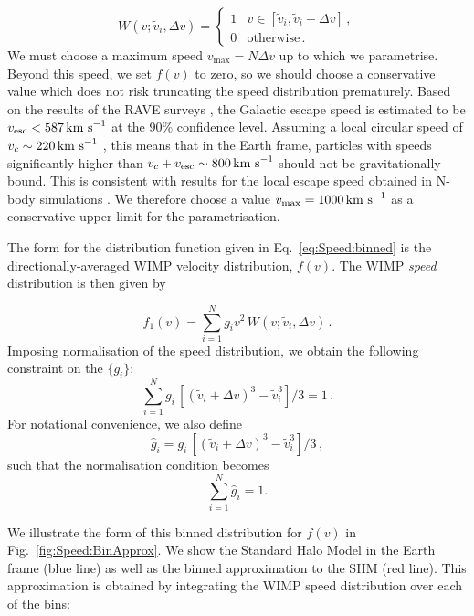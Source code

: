 \begin{equation}
W(v;\tilde{v}_i,\Delta v) =
\begin{cases}
   1 &  v \in [\tilde{v}_i,\tilde{v}_i+\Delta v]\,, \\
   0  & \text{otherwise}\,.
  \end{cases}
\end{equation}
We must choose a maximum speed $v_\textrm{max} = N\Delta v$ up to which we parametrise. Beyond this speed, we set $f(v)$ to zero, so we should choose a conservative value which does not risk truncating the speed distribution prematurely. Based on the results of the RAVE surveys \cite{RAVE:2007, RAVE:2014}, the Galactic escape speed is estimated to be $\vesc < 587 \kms$ at the 90\% confidence level. Assuming a local circular speed of $v_c \sim 220 \,\textrm{km s}^{-1}$ \cite{Kerr:1986,Feast:1997}, this means that in the Earth frame, particles with speeds significantly higher than $v_c + \vesc \sim 800 \kms$ should not be gravitationally bound. This is consistent with results for the local escape speed obtained in N-body simulations \cite{Kuhlen:2010}. We therefore choose a value $v_\textrm{max} = 1000 \,\textrm{km s}^{-1}$ as a conservative upper limit for the parametrisation.

The form for the distribution function given in Eq.~\ref{eq:Speed:binned} is the directionally-averaged WIMP velocity distribution, $f(v)$. The WIMP \textit{speed} distribution is then given by

\begin{equation}
\label{eq:Speed:binned2}
f_1(v) = \sum_{i = 1}^N g_i v^2\, W(v;\tilde{v}_i,\Delta v) \,.
\end{equation}
Imposing normalisation of the speed distribution, we obtain the following constraint on the \(\{g_i\}\):
\begin{equation}
\label{eq:Speed:Normg}
\sum_{i = 1}^N g_i \, \left[(\tilde{v}_i + \Delta v)^3 - \tilde{v}_i^3\right]/3 = 1 \,.
\end{equation}
For notational convenience, we also define
\begin{equation}
\hat{g}_i = g_i \, \left[(\tilde{v}_i + \Delta v)^3 - \tilde{v}_i^3\right]/3 \,,
\end{equation}
such that the normalisation condition becomes
\begin{equation}
\label{eq:Speed:ghat}
\sum_{i = 1}^N \hat{g}_i = 1.
\end{equation}

We illustrate the form of this binned distribution for $f(v)$ in Fig.~\ref{fig:Speed:BinApprox}. We show the Standard Halo Model in the Earth frame (blue line) as well as the binned approximation to the SHM (red line). This approximation is obtained by integrating the WIMP speed distribution over each of the bins:

